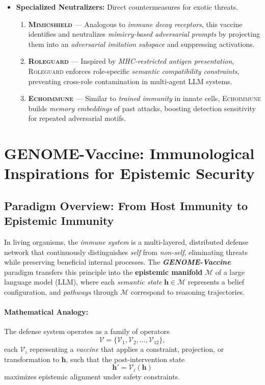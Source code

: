 \begin{itemize}
    \item \textbf{Specialized Neutralizers:} Direct countermeasures for exotic threats.
    \begin{enumerate}
        \item \textbf{\textsc{Mimicshield}} — Analogous to \emph{immune decoy receptors}, this vaccine identifies and neutralizes \emph{mimicry-based adversarial prompts} by projecting them into an \emph{adversarial imitation subspace} and suppressing activations.

        \item \textbf{\textsc{Roleguard}} — Inspired by \emph{MHC-restricted antigen presentation}, \textsc{Roleguard} enforces role-specific \emph{semantic compatibility constraints}, preventing cross-role contamination in multi-agent LLM systems.

        \item \textbf{\textsc{Echoimmune}} — Similar to \emph{trained immunity} in innate cells, \textsc{Echoimmune} builds \emph{memory embeddings} of past attacks, boosting detection sensitivity for repeated adversarial motifs.
    \end{enumerate}
\end{itemize}



\section*{GENOME-Vaccine: Immunological Inspirations for Epistemic Security}

\subsection*{Paradigm Overview: From Host Immunity to Epistemic Immunity}

In living organisms, the \emph{immune system} is a multi-layered, distributed defense network that continuously distinguishes \emph{self} from \emph{non-self}, eliminating threats while preserving beneficial internal processes. The \textbf{\emph{GENOME-Vaccine}} paradigm transfers this principle into the \textbf{epistemic manifold} $\mathcal{M}$ of a large language model (LLM), where each \emph{semantic state} $\mathbf{h} \in \mathcal{M}$ represents a belief configuration, and \emph{pathways} through $\mathcal{M}$ correspond to reasoning trajectories.

\paragraph{Mathematical Analogy:} 
The defense system operates as a family of operators 
\[
\mathcal{V} = \{\mathcal{V}_1, \mathcal{V}_2, \dots, \mathcal{V}_{12}\},
\]
each $\mathcal{V}_i$ representing a \emph{vaccine} that applies a constraint, projection, or transformation to $\mathbf{h}$, such that the post-intervention state 
\[
\mathbf{h}' = \mathcal{V}_i(\mathbf{h})
\]
maximizes epistemic alignment under safety constraints.

